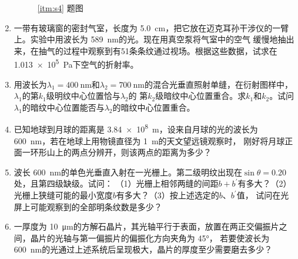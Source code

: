 \documentclass[UTF-8]{ctexart}
\newcommand{\csi}[2]{ \SI{#1}{#2}}
\newcommand{\cang}[1]{ \ang{#1}}
\newcommand{\lbd}[3]{\(\lambda_{#3}=\csi{#1}{#2}\)}
\begin{document}
\begin{enumerate}
\begin{figure}[htb]
\begin{minipage}[b]{0.4\textwidth}
                \caption{\ref{itm:s4} 题图}
            \end{minipage}
        \end{figure}
    \item 一带有玻璃窗的密封气室，长度为\csi{5.0}{\cm}，把它放在迈克耳孙干涉仪的一臂上。实验中用波长为\csi{589}{\nm}的光。现在用真空泵将气室中的空气
        缓慢地抽出来，在抽气的过程中观察到有51条条纹通过视场。根据这些数据，试求在\csi{1.013e5}{\Pa}下空气的折射率。
    \item 用波长为\lbd{400}{\nm}{1}和\lbd{700}{\nm}{2}的混合光垂直照射单缝，在衍射图样中，\(\lambda_1\)的第\(k_1\)级明纹中心位置恰与\(\lambda_2\)的
        第\(k_2\)级暗纹中心位置重合。求\(k_1\)和\(k_2\)。试问\(\lambda_1\)的暗纹中心位置能否与\(\lambda_2\)的暗纹中心位置重合。
    \item 已知地球到月球的距离是\csi{3.84e8}{\m}，设来自月球的光的波长为\csi{600}{nm}，若在地球上用物镜直径为\csi{1}{\m}的天文望远镜观察时，
        刚好将月球正面一环形山上的两点分辨开，则该两点的距离为多少？
    \item 波长\csi{600}{\nm}的单色光垂直入射在一光栅上。第二级明纹出现在\(\sin \theta = 0.20\) 处，且第四级缺级。试问：
        （1）光栅上相邻两缝的间距\(b+b^\prime\)有多大？（2）光栅上狭缝可能的最小宽度\(b\)有多大？（3）按上述选定的\(b\)、\(b^\prime\)值，
        试问在光屏上可能观察到的全部明条纹数是多少？
    \item 一厚度为\csi{10}{\um}的方解石晶片，其光轴平行于表面，放置在两正交偏振片之间，晶片的光轴与第一偏振片的偏振化方向夹角为\cang{45}，
        若要使波长为\csi{600}{\nm}的光通过上述系统后呈现极大，晶片的厚度至少需要磨去多少？
\end{enumerate}
\end{document}
